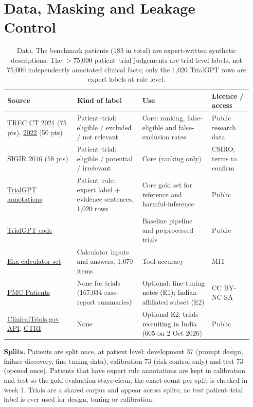 \documentclass[10pt,a4paper]{article}
\begin{document}
\section{Data, Masking and Leakage Control}\label{sec:data}
\begin{table}[H]
\centering\footnotesize
\begin{tabularx}{\textwidth}{@{}P{3.5cm}P{3.4cm}LP{2.1cm}@{}}
\toprule
\textbf{Source} & \textbf{Kind of label} & \textbf{Use} & \textbf{Licence / access}\\
\midrule
\href{https://www.trec-cds.org/2021.html}{TREC CT 2021} (75 pts), \href{https://www.trec-cds.org/2022.html}{2022} (50 pts) & Patient--trial: eligible / excluded / not relevant & Core: ranking, false-eligible and false-exclusion rates & Public research data\\
\href{https://data.csiro.au/collection/csiro:17152}{SIGIR 2016} (58 pts) & Patient--trial: eligible / potential / irrelevant & Core (ranking only) & CSIRO; terms to confirm\\
\href{https://huggingface.co/datasets/ncbi/TrialGPT-Criterion-Annotations}{TrialGPT annotations} & Patient--rule: expert label + evidence sentences, 1{,}020 rows & Core gold set for inference and harmful-inference & Public\\
\href{https://github.com/ncbi-nlp/TrialGPT}{TrialGPT code} & -- & Baseline pipeline and preprocessed trials & Public\\
\href{https://huggingface.co/datasets/ekacare/medical_calculator_eval}{Eka calculator set} & Calculator inputs and answers, 1{,}070 items & Tool accuracy & MIT\\
\href{https://pmc-patients.github.io/}{PMC-Patients}~\cite{pmcp} & None for trials (167{,}034 case-report summaries) & Optional: fine-tuning notes (E1); Indian-affiliated subset (E2) & CC BY-NC-SA\\
\href{https://clinicaltrials.gov/data-api/api}{ClinicalTrials.gov API}, \href{https://ctri.nic.in}{CTRI} & None & Optional E2: trials recruiting in India (605 on 2 Oct 2026) & Public\\
\bottomrule
\end{tabularx}
\caption{Data. The benchmark patients (183 in total) are expert-written synthetic descriptions. The \(>\)75{,}000 patient--trial judgements are trial-level labels, not 75{,}000 independently annotated clinical facts; only the 1{,}020 TrialGPT rows are expert labels at rule level.}
\end{table}

\textbf{Splits.} Patients are split once, at patient level: development 37 (prompt design, failure discovery, fine-tuning data), calibration 73 (risk control only) and test 73 (opened once). Patients that have expert rule annotations are kept in calibration and test so the gold evaluation stays clean; the exact count per split is checked in week 1. Trials are a shared corpus and appear across splits; no test patient--trial label is ever used for design, tuning or calibration.
\end{document}
